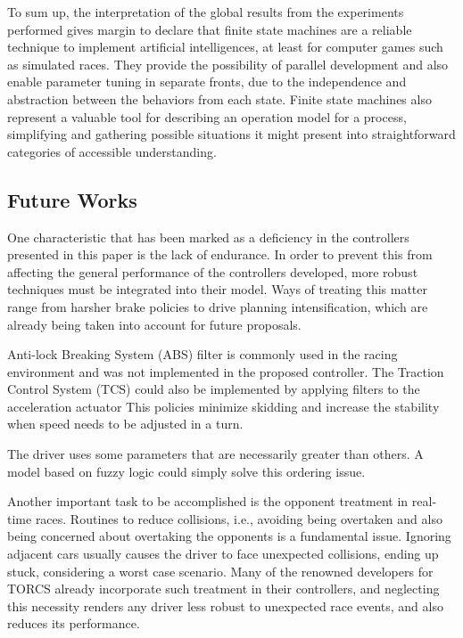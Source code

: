 	To sum up, the interpretation of the global results from the experiments performed gives margin to declare that finite state machines are a reliable technique to implement artificial intelligences, at least for computer games such as simulated races. They provide the possibility of parallel development and also enable parameter tuning in separate fronts, due to the independence and abstraction between the behaviors from each state. Finite state machines also represent a valuable tool for describing an operation model for a process, simplifying and gathering possible situations it might present into straightforward categories of accessible understanding.

\subsection{Future Works} \label{subsec:Future}
	
	One characteristic that has been marked as a deficiency in the controllers presented in this paper is the lack of endurance. In order to prevent this from affecting the general performance of the controllers developed, more robust techniques must be integrated into their model. Ways of treating this matter range from harsher brake policies to drive planning intensification, which are already being taken into account for future proposals.
	
	Anti-lock Breaking System (ABS) filter is commonly used in the racing environment  and was not implemented in the proposed controller. The Traction Control System (TCS)  could also be implemented by applying filters to the acceleration actuator This policies minimize skidding and increase the stability when speed needs to be adjusted in a turn.
	
	The driver uses some parameters that are necessarily greater than others. A model based on fuzzy logic  could simply solve this ordering issue.
	
	Another important task to be accomplished is the opponent treatment in real-time races. Routines to reduce collisions, i.e., avoiding being overtaken and also being concerned about overtaking the opponents is a fundamental issue. Ignoring adjacent cars usually causes the driver to face unexpected collisions, ending up stuck, considering a worst case scenario. Many of the renowned developers for TORCS already incorporate such treatment in their controllers, and neglecting this necessity renders any driver less robust to unexpected race events, and also reduces its performance.
	
	